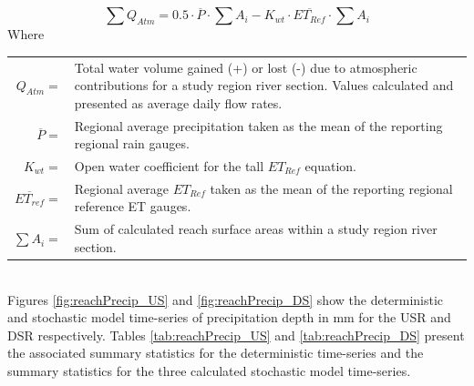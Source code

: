 \begin{equation}
\sum Q_{Atm} = 0.5 \cdot \overline{P} \cdot \sum A_{i} - K_{wt} \cdot \overline{ET_{Ref}} \cdot \sum A_{i}
\label{eq:atm4}
\end{equation}
Where\\
\begin{tabular}{r p{5.5in}}
	$Q_{Atm} =$&Total water volume gained (+) or lost (-) due to atmospheric contributions for a study region river section. Values calculated and presented as average daily flow rates.\\
	$\overline{P} =$&Regional average precipitation taken as the mean of the reporting regional rain gauges.\\
	$K_{wt} =$& Open water coefficient for the tall $ET_{Ref}$ equation.\\
	$\overline{ET_{ref}} =$&Regional average $ET_{Ref}$ taken as the mean of the reporting regional reference ET gauges.\\
	$\sum A_{i}=$&Sum of calculated reach surface areas within a study region river section. \\
\end{tabular}\\

Figures \ref{fig:reachPrecip_US} and \ref{fig:reachPrecip_DS} show the deterministic and stochastic model time-series of precipitation depth in \si{\milli\meter} for the USR and DSR respectively.  Tables \ref{tab:reachPrecip_US} and \ref{tab:reachPrecip_DS} present the associated summary statistics for the deterministic time-series and the summary statistics for the three calculated stochastic model time-series.

